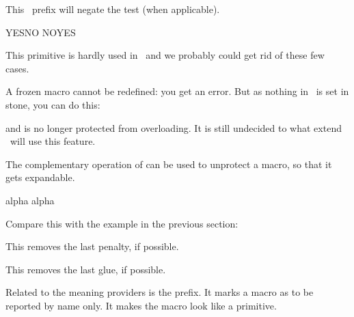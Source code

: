 \startoldprimitive[title={\prm {unless}}]

This \ETEX\ prefix will negate the test (when applicable).

\starttyping
       \ifx\one\two YES\else NO\fi
\unless\ifx\one\two NO\else YES\fi
\stoptyping

This primitive is hardly used in \CONTEXT\ and we probably could get rid of these
few cases.

\stopoldprimitive

\startnewprimitive[title={\prm {unletfrozen}}]

A frozen macro cannot be redefined: you get an error. But as nothing in \TEX\ is set
in stone, you can do this:

\starttyping
\frozen{}
\unletfrozen\MyMacro
\stoptyping

and \type {\MyMacro} is no longer protected from overloading. It is still
undecided to what extend \CONTEXT\ will use this feature.

\stopnewprimitive

\startnewprimitive[title={\prm {unletprotected}}]

The complementary operation of  can be used to unprotect
a macro, so that it gets expandable.

\startbuffer
               \def  \MyMacroA{alpha}
\protected     {}
               \edef \MyMacroC{\MyMacroA\MyMacroB}
\unletprotected      \MyMacroB
               \edef \MyMacroD{\MyMacroA\MyMacroB}
\meaning             \MyMacroC\crlf
\meaning             \MyMacroD\par
\stopbuffer

\typebuffer

Compare this with the example in the previous section:

{\tttf \getbuffer}

\stopnewprimitive

\startoldprimitive[title={\prm {unpenalty}}]

This removes the last penalty, if possible.

\stopoldprimitive

\startoldprimitive[title={\prm {unskip}}]

This removes the last glue, if possible.

\stopoldprimitive

\startnewprimitive[title={\prm {untraced}}]

Related to the meaning providers is the  prefix. It marks a macro
as to be reported by name only. It makes the macro look like a primitive.

